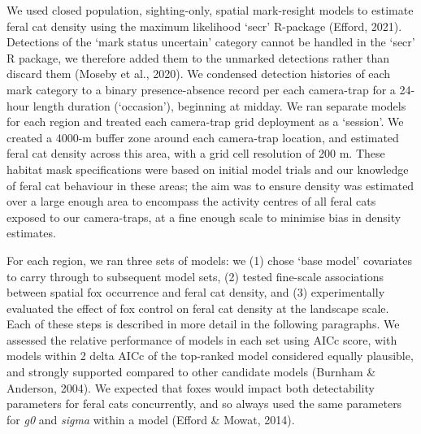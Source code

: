 \documentclass[]{elsarticle} %
\begin{document}
We used closed population, sighting-only, spatial mark-resight models to estimate feral cat density using the maximum likelihood `secr' R-package (Efford, 2021). Detections of the `mark status uncertain' category cannot be handled in the `secr' R package, we therefore added them to the unmarked detections rather than discard them (Moseby et al., 2020). We condensed detection histories of each mark category to a binary presence-absence record per each camera-trap for a 24-hour length duration (`occasion'), beginning at midday. We ran separate models for each region and treated each camera-trap grid deployment as a `session'. We created a 4000-m buffer zone around each camera-trap location, and estimated feral cat density across this area, with a grid cell resolution of 200 m. These habitat mask specifications were based on initial model trials and our knowledge of feral cat behaviour in these areas; the aim was to ensure density was estimated over a large enough area to encompass the activity centres of all feral cats exposed to our camera-traps, at a fine enough scale to minimise bias in density estimates.

For each region, we ran three sets of models: we (1) chose `base model' covariates to carry through to subsequent model sets, (2) tested fine-scale associations between spatial fox occurrence and feral cat density, and (3) experimentally evaluated the effect of fox control on feral cat density at the landscape scale. Each of these steps is described in more detail in the following paragraphs. We assessed the relative performance of models in each set using AICc score, with models within 2 delta AICc of the top-ranked model considered equally plausible, and strongly supported compared to other candidate models (Burnham \& Anderson, 2004). We expected that foxes would impact both detectability parameters for feral cats concurrently, and so always used the same parameters for \emph{g0} and \emph{sigma} within a model (Efford \& Mowat, 2014).
\end{document}
